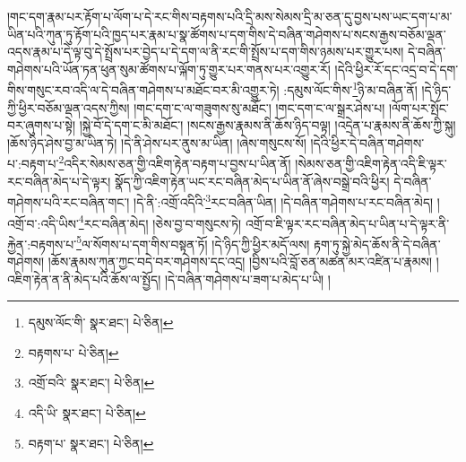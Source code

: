 །གང་དག་རྣམ་པར་རྟོག་པ་ལོག་པ་དེ་རང་གིས་བརྟགས་པའི་དྲི་མས་སེམས་དྲི་མ་ཅན་དུ་བྱས་པས་ཡང་དག་པ་མ་ཡིན་པའི་ཀུན་ཏུ་རྟོག་པའི་ཁྱད་པར་རྣམ་པ་སྣ་ཚོགས་པ་དག་གིས་དེ་བཞིན་གཤེགས་པ་སངས་རྒྱས་བཅོམ་ལྡན་འདས་རྣམ་པ་དེ་ལྟ་བུ་དེ་སྤྲོས་པར་བྱེད་པ་དེ་དག་ལ་ནི་རང་གི་སྤྲོས་པ་དག་གིས་ཉམས་པར་གྱུར་པས། དེ་བཞིན་གཤེགས་པའི་ཡོན་ཏན་ཕུན་སུམ་ཚོགས་པ་ལྐོག་ཏུ་གྱུར་པར་གནས་པར་འགྱུར་རོ། །དེའི་ཕྱིར་རོ་དང་འདྲ་བ་དེ་དག་གིས་གསུང་རབ་འདི་ལ་དེ་བཞིན་གཤེགས་པ་མཐོང་བར་མི་འགྱུར་ཏེ། :དམུས་ལོང་གིས་\footnote{དམུས་ལོང་གི་  སྣར་ཐང་།  པེ་ཅིན། }ཉི་མ་བཞིན་ནོ། །དེ་ཉིད་ཀྱི་ཕྱིར་བཅོམ་ལྡན་འདས་ཀྱིས། །གང་དག་ང་ལ་གཟུགས་སུ་མཐོང་། །གང་དག་ང་ལ་སྒྲར་ཤེས་པ། །ལོག་པར་སྤོང་བར་ཞུགས་པ་སྟེ། །སྐྱེ་བོ་དེ་དག་ང་མི་མཐོང་། །སངས་རྒྱས་རྣམས་ནི་ཆོས་ཉིད་བལྟ། །འདྲེན་པ་རྣམས་ནི་ཆོས་ཀྱི་སྐུ། །ཆོས་ཉིད་ཤེས་བྱ་མ་ཡིན་ཏེ། །དེ་ནི་ཤེས་པར་ནུས་མ་ཡིན། །ཞེས་གསུངས་སོ། །དེའི་ཕྱིར་དེ་བཞིན་གཤེགས་པ་:བརྟག་པ་\footnote{བརྟགས་པ་  པེ་ཅིན། }འདིར་སེམས་ཅན་གྱི་འཇིག་རྟེན་བརྟག་པ་བྱས་པ་ཡིན་ནོ། །སེམས་ཅན་གྱི་འཇིག་རྟེན་འདི་ཇི་ལྟར་རང་བཞིན་མེད་པ་དེ་ལྟར། སྣོད་ཀྱི་འཇིག་རྟེན་ཡང་རང་བཞིན་མེད་པ་ཡིན་ནོ་ཞེས་བསྒྲེ་བའི་ཕྱིར། དེ་བཞིན་གཤེགས་པའི་རང་བཞིན་གང་། །དེ་ནི་:འགྲོ་འདིའི་\footnote{འགྲོ་བའི་  སྣར་ཐང་།  པེ་ཅིན། }རང་བཞིན་ཡིན། །དེ་བཞིན་གཤེགས་པ་རང་བཞིན་མེད། །འགྲོ་བ་:འདི་ཡིས་\footnote{འདི་ཡི་  སྣར་ཐང་།  པེ་ཅིན། }རང་བཞིན་མེད། །ཅེས་བྱ་བ་གསུངས་ཏེ། འགྲོ་བ་ཇི་ལྟར་རང་བཞིན་མེད་པ་ཡིན་པ་དེ་ལྟར་ནི་རྐྱེན་:བརྟགས་པ་\footnote{བརྟག་པ་  སྣར་ཐང་།  པེ་ཅིན། }ལ་སོགས་པ་དག་གིས་བསྟན་ཏོ། །དེ་ཉིད་ཀྱི་ཕྱིར་མདོ་ལས། རྟག་ཏུ་སྐྱེ་མེད་ཆོས་ནི་དེ་བཞིན་གཤེགས། །ཆོས་རྣམས་ཀུན་ཀྱང་བདེ་བར་གཤེགས་དང་འདྲ། །བྱིས་པའི་བློ་ཅན་མཚན་མར་འཛིན་པ་རྣམས། །འཇིག་རྟེན་ན་ནི་མེད་པའི་ཆོས་ལ་སྤྱོད། །དེ་བཞིན་གཤེགས་པ་ཟག་པ་མེད་པ་ཡི། །
